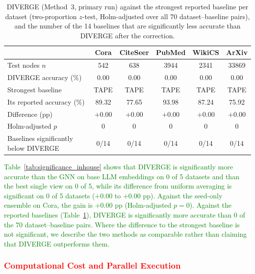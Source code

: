 \documentclass[a4paper,fleqn]{cas-sc}
\newcommand{\revone}[1]{\textcolor{red}{#1}}   %
\newcommand{\revthree}[1]{\textcolor{green}{#1}} %
\begin{document}
\begin{table}[htbp]
\centering\color{green}
\caption{DIVERGE (Method~3, primary run) against the strongest reported baseline per dataset (two-proportion $z$-test, Holm-adjusted over all 70 dataset--baseline pairs), and the number of the 14 baselines that are significantly less accurate than DIVERGE after the correction.}
\label{tab:significance_reported}
\small
\setlength{\tabcolsep}{3pt}
\begin{tabular*}{\textwidth}{@{\extracolsep{\fill}} lccccc @{}}
\toprule
 & \textbf{Cora} & \textbf{CiteSeer} & \textbf{PubMed} & \textbf{WikiCS} & \textbf{ArXiv} \\
\midrule
Test nodes $n$                    & 542 & 638 & 3944 & 2341 & 33869 \\
DIVERGE accuracy (\%)             & 0.00 & 0.00 & 0.00 & 0.00 & 0.00 \\
Strongest baseline                & TAPE & TAPE & TAPE & TAPE & TAPE \\
Its reported accuracy (\%)        & 89.32 & 77.65 & 93.98 & 87.24 & 75.92 \\
Difference (pp)                   & $+0.00$ & $+0.00$ & $+0.00$ & $+0.00$ & $+0.00$ \\
Holm-adjusted $p$                 & 0 & 0 & 0 & 0 & 0 \\
Baselines significantly below DIVERGE & 0/14 & 0/14 & 0/14 & 0/14 & 0/14 \\
\bottomrule
\end{tabular*}
\end{table}

\revthree{Table~\ref{tab:significance_inhouse} shows that DIVERGE is significantly more accurate than the GNN on base LLM embeddings on 0 of 5 datasets and than the best single view on 0 of 5, while its difference from uniform averaging is significant on 0 of 5 datasets ($+0.00$ to $+0.00$ pp). Against the seed-only ensemble on Cora, the gain is $+0.00$ pp (Holm-adjusted $p=0$). Against the reported baselines (Table~\ref{tab:significance_reported}), DIVERGE is significantly more accurate than 0 of the 70 dataset--baseline pairs. Where the difference to the strongest baseline is not significant, we describe the two methods as comparable rather than claiming that DIVERGE outperforms them.}


\subsubsection{\revone{Computational Cost and Parallel Execution}}\label{sec:efficiency}
\end{document}
